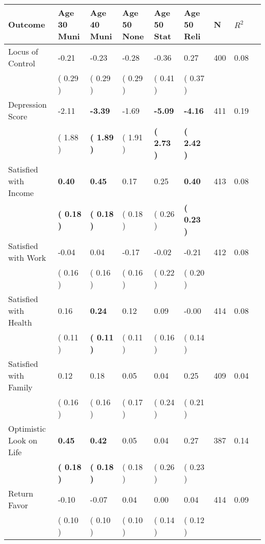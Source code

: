 \begin{tabular}{L{6.2cm} C{1.8cm} C{1.8cm} C{1.8cm} C{1.8cm} C{1.8cm} C{1.8cm} C{0.3cm} C{0.3cm}}
\toprule
 \textbf{Outcome} & \textbf{Age 30 Muni} & \textbf{Age 40 Muni} & \textbf{Age 50 None} & \textbf{Age 50 Stat} & \textbf{Age 50 Reli} & \textbf{N} & \textbf{$ R^2$} \\
\midrule
Locus of Control &     -0.21 &     -0.23 &     -0.28 &     -0.36 &      0.27  & 400 &       0.08 \\ 
 & (     0.29 ) & (     0.29 ) & (     0.29 ) & (     0.41 ) & (     0.37 )  & \\
Depression Score &     -2.11 & \textbf{    -3.39} &     -1.69 & \textbf{    -5.09} & \textbf{    -4.16}  & 411 &       0.19 \\ 
 & (     1.88 ) & \textbf{(     1.89 )} & (     1.91 ) & \textbf{(     2.73 )} & \textbf{(     2.42 )}  & \\
Satisfied with Income & \textbf{     0.40} & \textbf{     0.45} &      0.17 &      0.25 & \textbf{     0.40}  & 413 &       0.08 \\ 
 & \textbf{(     0.18 )} & \textbf{(     0.18 )} & (     0.18 ) & (     0.26 ) & \textbf{(     0.23 )}  & \\
Satisfied with Work &     -0.04 &      0.04 &     -0.17 &     -0.02 &     -0.21  & 412 &       0.08 \\ 
 & (     0.16 ) & (     0.16 ) & (     0.16 ) & (     0.22 ) & (     0.20 )  & \\
Satisfied with Health &      0.16 & \textbf{     0.24} &      0.12 &      0.09 &     -0.00  & 414 &       0.08 \\ 
 & (     0.11 ) & \textbf{(     0.11 )} & (     0.11 ) & (     0.16 ) & (     0.14 )  & \\
Satisfied with Family &      0.12 &      0.18 &      0.05 &      0.04 &      0.25  & 409 &       0.04 \\ 
 & (     0.16 ) & (     0.16 ) & (     0.17 ) & (     0.24 ) & (     0.21 )  & \\
Optimistic Look on Life & \textbf{     0.45} & \textbf{     0.42} &      0.05 &      0.04 &      0.27  & 387 &       0.14 \\ 
 & \textbf{(     0.18 )} & \textbf{(     0.18 )} & (     0.18 ) & (     0.26 ) & (     0.23 )  & \\
Return Favor &     -0.10 &     -0.07 &      0.04 &      0.00 &      0.04  & 414 &       0.09 \\ 
 & (     0.10 ) & (     0.10 ) & (     0.10 ) & (     0.14 ) & (     0.12 )  & \\

\end{tabular}
